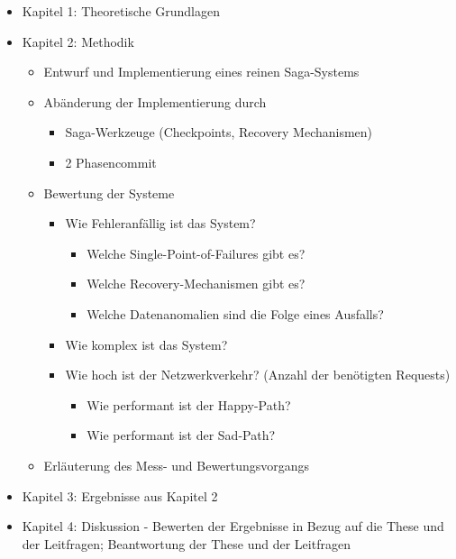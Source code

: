 \begin{itemize}
	\item Kapitel 1: Theoretische Grundlagen
	\item Kapitel 2: Methodik
	\begin{itemize}
		\item Entwurf und Implementierung eines reinen Saga-Systems
		\item Abänderung der Implementierung durch 
		\begin{itemize}
			\item Saga-Werkzeuge (Checkpoints, Recovery Mechanismen)
			\item 2 Phasencommit
		\end{itemize}
		\item Bewertung der Systeme
		\begin{itemize}
			\item Wie Fehleranfällig ist das System?
			\begin{itemize}
				\item Welche Single-Point-of-Failures gibt es?
				\item Welche Recovery-Mechanismen gibt es?
				\item Welche Datenanomalien sind die Folge eines Ausfalls?
			\end{itemize}
			\item Wie komplex ist das System?
			\item Wie hoch ist der Netzwerkverkehr? (Anzahl der benötigten Requests)
			\begin{itemize}
				\item Wie performant ist der Happy-Path? 
				\item Wie performant ist der Sad-Path?	
			\end{itemize}
		\end{itemize}
		\item Erläuterung des Mess- und Bewertungsvorgangs
	\end{itemize}
	\item Kapitel 3: Ergebnisse aus Kapitel 2
	\item Kapitel 4: Diskussion - Bewerten der Ergebnisse in Bezug auf die These und der Leitfragen; Beantwortung der These und der Leitfragen
	
\end{itemize}













